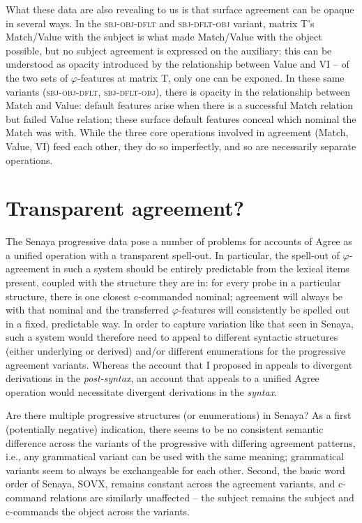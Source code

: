 \documentclass[output=paper
,modfonts
,nonflat]{langsci/langscibook}
\begin{document}
What these data are also revealing to us is that surface agreement can be opaque in several ways. In the \textsc{sbj-obj-dflt}  and \textsc{sbj-dflt-obj} variant, matrix T's Match/Value with the subject is what made Match/Value with the object possible, but no subject agreement is expressed on the auxiliary; this can be understood as opacity introduced by the relationship between Value and VI -- of the two sets of $\varphi$-features at matrix T, only one can be exponed. In these same variants (\textsc{sbj-obj-dflt}, \textsc{sbj-dflt-obj}), there is opacity in the relationship between Match and Value: default features arise when there is a successful Match relation but failed Value relation; these surface default features conceal which nominal the Match was with. While the three core operations involved in agreement (Match, Value, VI) feed each other, they do so imperfectly, and so are necessarily separate operations.

\section{Transparent agreement?} \label{sec-kalin:5}

The Senaya progressive data pose a number of problems for accounts of Agree as a unified operation with a transparent spell-out. In particular, the spell-out of $\varphi$-agreement in such a system should be entirely predictable from the lexical items present, coupled with the structure they are in: for every probe in a particular structure, there is one closest c-commanded nominal; agreement will always be with that nominal and the transferred $\varphi$-features will consistently be spelled out in a fixed, predictable way. In order to capture variation like that seen in Senaya, such a system would therefore need to appeal to different syntactic structures (either underlying or derived) and/or different enumerations for the progressive agreement variants. Whereas the account that I proposed in  appeals to divergent derivations in the \textit{post-syntax}, an account that appeals to a unified Agree operation would necessitate divergent derivations in the \textit{syntax}.

Are there multiple progressive structures (or enumerations) in Senaya? As a first (potentially negative) indication, there seems to be no consistent semantic difference  across the variants of the progressive with differing agreement patterns, i.e., any grammatical variant can be used with the same meaning; grammatical variants seem to always be exchangeable for each other. Second, the basic word order of Senaya, SOVX, remains constant across the agreement variants, and c-command relations are similarly unaffected -- the subject remains the subject and c-commands the object across the variants.
\end{document}
